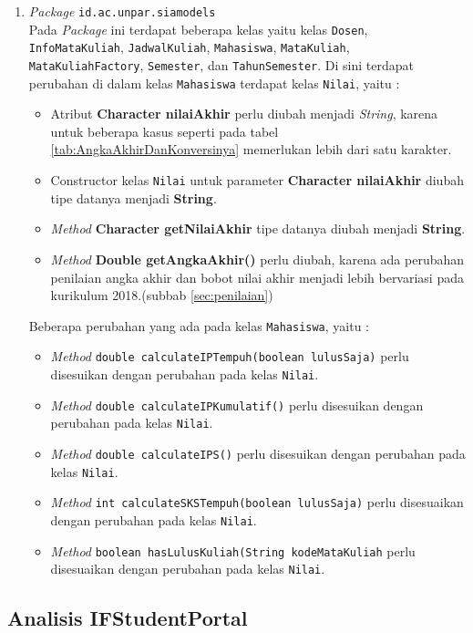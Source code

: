 \begin{enumerate}
	\item \textit{Package} \texttt{id.ac.unpar.siamodels}\\
	Pada \textit{Package} ini terdapat beberapa kelas yaitu kelas \texttt{Dosen}, \texttt{InfoMataKuliah}, \texttt{JadwalKuliah}, \texttt{Mahasiswa}, \texttt{MataKuliah}, \texttt{MataKuliahFactory}, \texttt{Semester}, dan \texttt{TahunSemester}. Di sini terdapat perubahan di dalam kelas \texttt{Mahasiswa} terdapat kelas \texttt{Nilai}, yaitu :
	\begin{itemize}
		\item Atribut \textbf{Character nilaiAkhir} perlu diubah menjadi \textit{String}, karena untuk beberapa kasus seperti pada tabel \ref{tab:AngkaAkhirDanKonversinya} memerlukan lebih dari satu karakter.
		\item Constructor kelas \texttt{Nilai} untuk parameter \textbf{Character nilaiAkhir} diubah tipe datanya menjadi \textbf{String}.
		\item \textit{Method} \textbf{Character getNilaiAkhir} tipe datanya diubah menjadi \textbf{String}.
		\item \textit{Method} \textbf{Double getAngkaAkhir()} perlu diubah, karena ada perubahan penilaian angka akhir dan bobot nilai akhir menjadi lebih bervariasi pada kurikulum 2018.(subbab \ref{sec:penilaian}) 
	\end{itemize}
	Beberapa perubahan yang ada pada kelas \texttt{Mahasiswa}, yaitu :
	\begin{itemize}
		\item \textit{Method} \texttt{double calculateIPTempuh(boolean lulusSaja)} perlu disesuikan dengan perubahan pada kelas \texttt{Nilai}.
		\item \textit{Method} \texttt{double calculateIPKumulatif()} perlu disesuikan dengan perubahan pada kelas \texttt{Nilai}.
		\item \textit{Method} \texttt{double calculateIPS()} perlu disesuikan dengan perubahan pada kelas \texttt{Nilai}.
		\item \textit{Method} \texttt{int calculateSKSTempuh(boolean lulusSaja)} perlu disesuaikan dengan perubahan pada kelas \texttt{Nilai}.
		\item \textit{Method} \texttt{boolean hasLulusKuliah(String kodeMataKuliah} perlu disesuaikan dengan perubahan pada kelas \texttt{Nilai}.
	\end{itemize}
\end{enumerate}

\subsection{Analisis IFStudentPortal}
\label{subbab:analisisifstudentportal}

